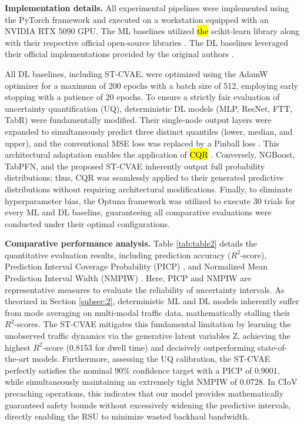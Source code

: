 \documentclass[journal]{IEEEtran}
\begin{document}
\textbf{Implementation details.}
All experimental pipelines were implemented using the PyTorch framework and executed on a workstation equipped with an NVIDIA RTX 5090 GPU.
The ML baselines utilized \hl{the} scikit-learn library along with their respective official open-source libraries \cite{a1, a2, a3}.
The DL baselines leveraged their official implementations provided by the original authors \cite{a4, a5, a6}.

All DL baselines, including ST-CVAE, were optimized using the AdamW optimizer \cite{x9} for a maximum of 200 epochs with a batch size of 512, employing early stopping with a patience of 20 epochs.
To ensure a strictly fair evaluation of uncertainty quantification (UQ), deterministic DL models (MLP, ResNet, FTT, TabR) were fundamentally modified.
Their single-node output layers were expanded to simultaneously predict three distinct quantiles (lower, median, and upper), and the conventional MSE loss was replaced by a Pinball loss \cite{x10}.
This architectural adaptation enables the application of \hl{CQR} \cite{x11}.
Conversely, NGBoost, TabPFN, and the proposed ST-CVAE inherently output full probability distributions; thus, CQR was seamlessly applied to their generated predictive distributions without requiring architectural modifications.
Finally, to eliminate hyperparameter bias, the Optuna framework \cite{x12} was utilized to execute 30 trials for every ML and DL baseline, guaranteeing all comparative evaluations were conducted under their optimal configurations.

\textbf{Comparative performance analysis.}
Table \ref{tab:table2} details the quantitative evaluation results, including prediction accuracy ($R^{2}$-score), Prediction Interval Coverage Probability (PICP) \cite{x13}, and Normalized Mean Prediction Interval Width (NMPIW) \cite{x14}.
Here, PICP and NMPIW are representative measures to evaluate the reliability of uncertainty intervals.
As theorized in Section \ref{subsec:2}, deterministic ML and DL models inherently suffer from mode averaging on multi-modal traffic data, mathematically stalling their $R^{2}$-scores.
The ST-CVAE mitigates this fundamental limitation by learning the unobserved traffic dynamics via the generative latent variables Z, achieving the highest $R^{2}$-score (0.8153 for dwell time) and decisively outperforming state-of-the-art models.
Furthermore, assessing the UQ calibration, the ST-CVAE perfectly satisfies the nominal 90\% confidence target with a PICP of 0.9001, while simultaneously maintaining an extremely tight NMPIW of 0.0728.
In CIoV precaching operations, this indicates that our model provides mathematically guaranteed safety bounds without excessively widening the predictive intervals, directly enabling the RSU to minimize wasted backhaul bandwidth.
\end{document}

